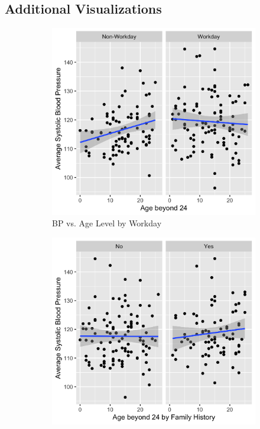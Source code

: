 \documentclass[12pt,twoside,letterpaper]{article}
\theoremstyle{definition}
\theoremstyle{definition}
\begin{document}
\begin{appendices}
    \section{Additional Visualizations}\label{sec: add visuals}

    \begin{figure}[h] 
        \centering
        \begin{subfigure}[b]{0.3\textwidth}
        \centering
        \includegraphics[width=\textwidth]{pics/bp by age and day.png}
        \caption[]%
        {{\small BP vs. Age Level by Workday}}
        \label{fig: bp v age and day}
        \end{subfigure}
        \hfill
        \begin{subfigure}[b]{0.3\textwidth}
        \centering
        \includegraphics[width=\textwidth]{pics/bp by age and fh.png}

\end{subfigure}
\end{figure}
\end{appendices}
\end{document}
